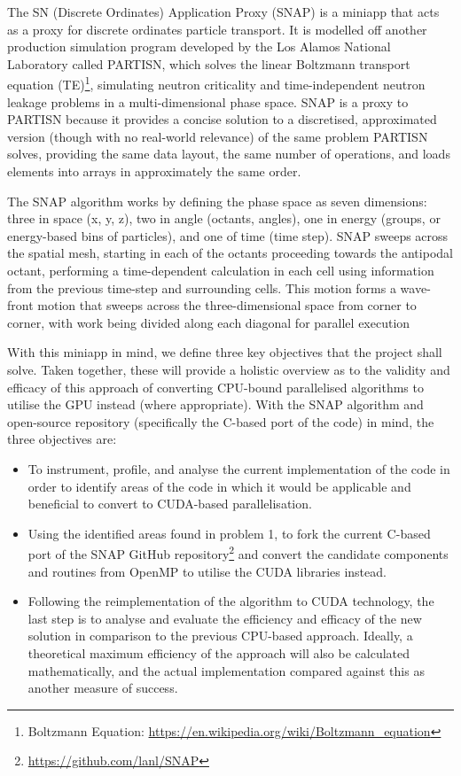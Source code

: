 \documentclass[conference]{IEEEtran}
\begin{document}
The SN (Discrete Ordinates) Application Proxy (SNAP) is a miniapp that acts as a proxy for discrete ordinates particle transport. It is modelled off another production simulation program developed by the Los Alamos National Laboratory called PARTISN, which solves the linear Boltzmann transport equation (TE)\footnote{Boltzmann Equation: \url{ https://en.wikipedia.org/wiki/Boltzmann_equation}}, simulating neutron criticality and time-independent neutron leakage problems\cite{partisn} in a multi-dimensional phase space. SNAP is a proxy to PARTISN because it provides a concise solution to a discretised, approximated version (though with no real-world relevance) of the same problem PARTISN solves, providing the same data layout, the same number of operations, and loads elements into arrays in approximately the same order.

The SNAP algorithm works by defining the phase space as seven dimensions: three in space (x, y, z), two in angle (octants, angles), one in energy (groups, or energy-based bins of particles), and one of time (time step). SNAP sweeps across the spatial mesh, starting in each of the octants proceeding towards the antipodal octant, performing a time-dependent calculation in each cell using information from the previous time-step and surrounding cells. This motion forms a wave-front motion that sweeps across the three-dimensional space from corner to corner, with work being divided along each diagonal for parallel execution

With this miniapp in mind, we define three key objectives that the project shall solve. Taken together, these will provide a holistic overview as to the validity and efficacy of this approach of converting CPU-bound parallelised algorithms to utilise the GPU instead (where appropriate). With the SNAP algorithm and open-source repository (specifically the C-based port of the code) in mind, the three objectives are:

\begin{itemize}

\item To instrument, profile, and analyse the current implementation of the code in order to identify areas of the code in which it would be applicable and beneficial to convert to CUDA-based parallelisation.

\item Using the identified areas found in problem 1, to fork the current C-based port of the SNAP GitHub repository\footnote{\url{https://github.com/lanl/SNAP}} and convert the candidate components and routines from OpenMP to utilise the CUDA libraries instead.

\item Following the reimplementation of the algorithm to CUDA technology, the last step is to analyse and evaluate the efficiency and efficacy of the new solution in comparison to the previous CPU-based approach. Ideally, a theoretical maximum efficiency of the approach will also be calculated mathematically, and the actual implementation compared against this as another measure of success.

\end{itemize}
\end{document}
